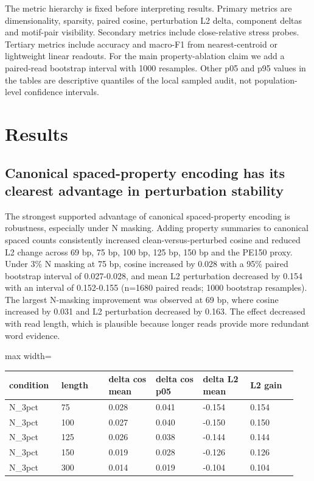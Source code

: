 \documentclass[11pt]{article}
\begin{document}
The metric hierarchy is fixed before interpreting results. Primary metrics are dimensionality, sparsity, paired cosine, perturbation L2 delta, component deltas and motif-pair visibility. Secondary metrics include close-relative stress probes. Tertiary metrics include accuracy and macro-F1 from nearest-centroid or lightweight linear readouts. For the main property-ablation claim we add a paired-read bootstrap interval with 1000 resamples. Other p05 and p95 values in the tables are descriptive quantiles of the local sampled audit, not population-level confidence intervals.


\section*{Results}

\subsection*{Canonical spaced-property encoding has its clearest advantage in perturbation stability}

The strongest supported advantage of canonical spaced-property encoding is robustness, especially under N masking. Adding property summaries to canonical spaced counts consistently increased clean-versus-perturbed cosine and reduced L2 change across 69 bp, 75 bp, 100 bp, 125 bp, 150 bp and the PE150 proxy. Under 3\% N masking at 75 bp, cosine increased by 0.028 with a 95\% paired bootstrap interval of 0.027-0.028, and mean L2 perturbation decreased by 0.154 with an interval of 0.152-0.155 (n=1680 paired reads; 1000 bootstrap resamples). The largest N-masking improvement was observed at 69 bp, where cosine increased by 0.031 and L2 perturbation decreased by 0.163. The effect decreased with read length, which is plausible because longer reads provide more redundant word evidence.


\begin{center}
\scriptsize
\begin{adjustbox}{max width=\linewidth}
\begin{tabularx}{\linewidth}{@{}p{0.157\linewidth}p{0.157\linewidth}p{0.157\linewidth}p{0.157\linewidth}p{0.157\linewidth}p{0.157\linewidth}@{}}
\toprule
\textbf{condition} & \textbf{length} & \textbf{delta cos mean} & \textbf{delta cos p05} & \textbf{delta L2 mean} & \textbf{L2 gain} \\
\midrule
N\_3pct & 75 & 0.028 & 0.041 & -0.154 & 0.154 \\
N\_3pct & 100 & 0.027 & 0.040 & -0.150 & 0.150 \\
N\_3pct & 125 & 0.026 & 0.038 & -0.144 & 0.144 \\
N\_3pct & 150 & 0.019 & 0.028 & -0.126 & 0.126 \\
N\_3pct & 300 & 0.014 & 0.019 & -0.104 & 0.104 \\
\bottomrule
\end{tabularx}
\end{adjustbox}
\end{center}
\normalsize
\end{document}
